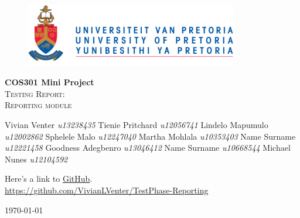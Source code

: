 \begin{titlepage}
	\begin{center}
		
		\begin{figure}[t]
			\centering
			\includegraphics[width=350px]{images/UP_Logo.png}
		\end{figure}
		
		\textbf{\Large COS301 Mini Project } \\
		\textsc{\Large Testing Report:  } \\
		\textsc{\Large Reporting module } \\
		
		\begin{flushright} \large
			Vivian Venter 		\emph{u13238435} \newline
			Tienie Pritchard 	\emph{u12056741} \newline
			Lindelo Mapumulo	\emph{u12002862} \newline
			Sphelele Malo 		\emph{u12247040} \newline
			Martha Mohlala 		\emph{u10353403} \newline
			Name Surname 		\emph{u12221458} \newline
			Goodness Adegbenro	\emph{u13046412} \newline
			Name Surname 		\emph{u10668544} \newline
			Michael Nunes 		\emph{u12104592} \newline
		\end{flushright}
		
		\vfill
		
	Here's a link to \href{https://github.com/VivianLVenter/TestPhase-Reporting}{GitHub}.\\
	\url{https://github.com/VivianLVenter/TestPhase-Reporting}

	\vfill

	{\large \today}		
		
		
	\end{center}
\end{titlepage}
